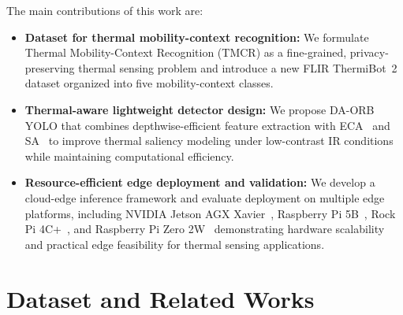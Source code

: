 \documentclass[journal,twoside,web]{ieeecolor}
\begin{document}
{The main contributions of this work are:}
\begin{itemize}
    \item \textbf{Dataset for thermal mobility-context recognition:} We formulate Thermal Mobility-Context Recognition (TMCR) as a fine-grained, privacy-preserving thermal sensing problem and introduce a new FLIR ThermiBot~2 dataset organized into five mobility-context classes. %
    
    \item \textbf{Thermal-aware lightweight detector design:} We propose DA-ORB YOLO that combines depthwise-efficient feature extraction with ECA~\cite{wang2020eca} and SA~\cite{bao2023sctanet} to improve thermal saliency modeling under low-contrast IR conditions while maintaining computational efficiency.
    
    \item \textbf{Resource-efficient edge deployment and validation:} We develop a cloud-edge inference framework and evaluate deployment on multiple edge platforms, including NVIDIA Jetson AGX Xavier~\cite{jetson_agx_xavier}, Raspberry Pi 5B~\cite{raspberry_pi_5}, Rock Pi 4C+~\cite{rock_pi_4c_plus}, and Raspberry Pi Zero 2W~\cite{raspberry_pi_zero_2w} demonstrating hardware scalability and practical edge feasibility for thermal sensing applications.
\end{itemize}


\section{Dataset and Related Works}
\end{document}
